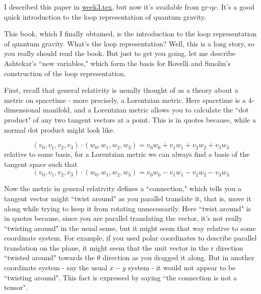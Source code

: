 
I described this paper in {\hyperref[week3]{week3.tex}}, but now it's available from gr-qc. It's a good quick introduction to the loop representation of quantum gravity.


This book, which I finally obtained, is the introduction to the loop representation of quantum gravity. What's the loop representation? Well, this is a long story, so you really should read the book. But just to get you going, let me describe Ashtekar's ``new variables," which form the basis for Rovelli and Smolin's construction of the loop representation.

First, recall that general relativity is usually thought of as a theory about a metric on spacetime - more precisely, a Lorentzian metric. Here spacetime is a 4-dimensional manifold, and a Lorentzian metric allows you to calculate the ``dot product" of any two tangent vectors at a point. This is in quotes because, while a normal dot product might look like.

\[(v_0,v_1,v_2,v_3) \cdot (w_0,w_1,w_2,w_3) =  v_0w_0 + v_1w_1 + v_2w_2 + v_3w_3\]
relative to some basis, for a Lorentzian metric we can always find a basis of the tangent space such that
\[(v_0,v_1,v_2,v_3)\cdot (w_0,w_1,w_2,w_3) = v_0w_0 - v_1w_1 - v_2w_2 - v_3w_3\]

Now the metric in general relativity defines a ``connection," which tells you a tangent vector might ``twist around" as you parallel translate it, that is, move it along while trying to keep it from rotating unnecessarily. Here ``twist around" is in quotes because, since you are parallel translating the vector, it's not really ``twisting around" in the usual sense, but it might seem that way relative to some coordinate system. For example, if you used polar coordinates to describe parallel translation on the plane, it might seem that the unit vector in the r direction ``twisted around" towards the $\theta$ direction as you dragged it along. But in another coordinate system - say the usual $x-y$ system - it would not appear to be ``twisting around". This fact is expressed by saying ``the connection is not a tensor".

